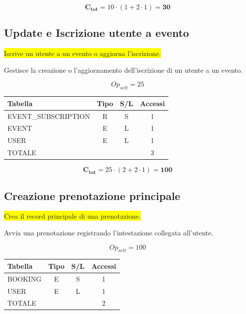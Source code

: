 \documentclass[a4paper,12pt]{report}
\begin{document}
$$\mathbf{C_{tot}} = 10 \cdot (1 + 2 \cdot 1) = \mathbf{30}$$

\subsection*{Update e Iscrizione utente a evento} \label{op12}
\colorbox{yellow}{Iscrive un utente a un evento o aggiorna l'iscrizione.}

Gestisce la creazione o l'aggiornamento dell'iscrizione di un utente
a un evento.

$$Op_{sett} = 25$$

\begin{table}[H]
  \centering
  \small
  \renewcommand{\arraystretch}{1.15}
  \begin{tabularx}{0.7\textwidth}{|X|c|c|c|}
    \hline
    \rowcolor{gray!20}
    \textbf{Tabella} & \textbf{Tipo} & \textbf{S/L} & \textbf{Accessi} \\
    \hline
    EVENT\_SUBSCRIPTION & R & S & 1 \\
    EVENT & E & L & 1 \\
    USER & E & L & 1 \\
    \hline
    \rowcolor{gray!20}
    TOTALE & & & 3 \\
    \hline
  \end{tabularx}
  \vspace{-1em}
\end{table}

$$\mathbf{C_{tot}} = 25 \cdot (2 + 2 \cdot 1) = \mathbf{100}$$

\subsection*{Creazione prenotazione principale} \label{op13}
\colorbox{yellow}{Crea il record principale di una prenotazione.}

Avvia una prenotazione registrando l'intestazione collegata all'utente.

$$Op_{sett} = 100$$

\begin{table}[H]
  \centering
  \small
  \renewcommand{\arraystretch}{1.15}
  \begin{tabularx}{0.7\textwidth}{|X|c|c|c|}
    \hline
    \rowcolor{gray!20}
    \textbf{Tabella} & \textbf{Tipo} & \textbf{S/L} & \textbf{Accessi} \\
    \hline
    BOOKING & E & S & 1 \\
    USER & E & L & 1 \\
    \hline
    \rowcolor{gray!20}
    TOTALE & & & 2 \\
    \hline
  \end{tabularx}
  \vspace{-1em}
\end{table}
\end{document}
